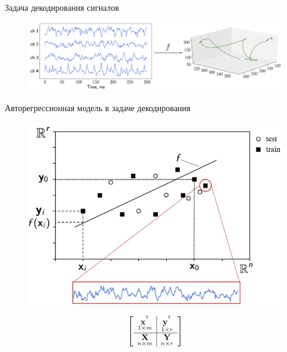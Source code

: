 \documentclass[9pt]{beamer}
\newcommand{\bx}{\mathbf{x}}
\newcommand{\by}{\mathbf{y}}
\newcommand{\bX}{\mathbf{X}}
\newcommand{\bY}{\mathbf{Y}}
\newcommand{\T}{^{\text{\tiny\sffamily\upshape\mdseries T}}}
\begin{document}
\begin{frame}{Задача декодирования сигналов}
    \begin{figure}
    	\includegraphics[width=0.9\linewidth]{figs/slide3_1}
    \end{figure}
	\vspace{-0.3cm}

	\begin{minipage}{.5\linewidth}
		\begin{block}{Авторегрессионная модель в задаче декодирования}
		\begin{figure}
			\includegraphics[width=0.8\linewidth]{figs/slide3_3}
		\end{figure}
		\[
		\left[\begin{array}{c|c c} 
			\underset{1 \times m}{\bx^{\T}} & \underset{1 \times r}{\by^{\T}} \\ 
			\hline 
			\underset{n \times m}{\bX} & \underset{n \times r}{\bY} 
		\end{array}\right]
		\]
		\end{block}
		

\end{minipage}
\end{frame}
\end{document}
